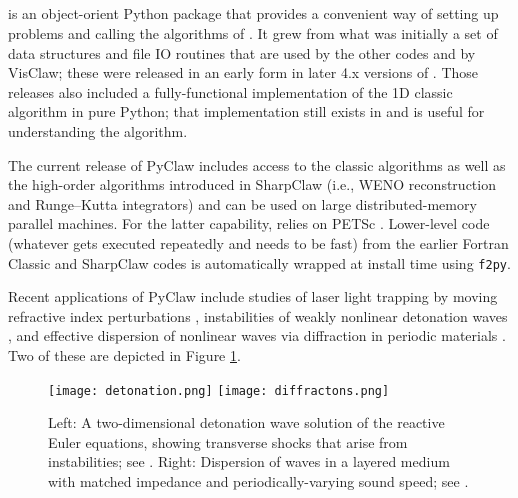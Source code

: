 %
%
%

\subsection{\pyclaw} \label{sec:pyclaw}
\pyclaw is an object-orient Python package that provides a convenient way
of setting up problems and calling the algorithms of \clawpack.  It grew
from what was initially a set of data structures and file IO routines that are
used by the other \clawpack codes and by VisClaw; these were released in
an early form in later 4.x versions of \clawpack.  Those releases also
included a fully-functional implementation of the 1D classic algorithm
in pure Python; that implementation still exists in \pyclaw and is useful
for understanding the algorithm.

The current release of PyClaw includes access to the classic algorithms as well
as the high-order algorithms introduced in SharpClaw \cite{2013_sharpclaw} (i.e., WENO
reconstruction and Runge--Kutta integrators) and can be used on large
distributed-memory parallel machines.  For the latter capability, \pyclaw
relies on PETSc \cite{petsc-user-ref}.
Lower-level code (whatever gets executed
repeatedly and needs to be fast) from the earlier Fortran Classic and SharpClaw
codes is automatically wrapped at install time using \texttt{f2py}.

Recent applications of PyClaw include studies of laser light trapping by moving
refractive index perturbations \cite{sanroman_thesis}, instabilities of weakly nonlinear detonation
waves \cite{faria2015qualitative}, and effective dispersion of nonlinear waves via diffraction in
periodic materials \cite{2015_diffractons}.  Two of these are depicted in Figure
\ref{fig:pyclaw-apps}.

\begin{figure}
\hfil\texttt{[image: detonation.png]}
\hskip 5pt
\hfil\texttt{[image: diffractons.png]}
\hskip 5pt
\caption{\label{fig:pyclaw-apps}
Left: A two-dimensional detonation wave solution of the reactive Euler equations,
showing transverse shocks that arise from instabilities; see \cite{faria2015qualitative}.
Right: Dispersion of waves in a layered medium with matched impedance and periodically-varying
sound speed; see \cite{2015_diffractons}.}
\end{figure}


